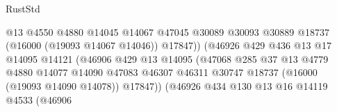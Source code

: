 \begin{lexlean}{RustStd}
\begin{coremodule}
                                                  @13
                                                  @4550
                                                  @4880
                                                  @14045
                                                  @14067
                                                  @47045
                                                  @30089
                                                  @30093
                                                  @30889
                                                  @18737
                                                  (@16000 (@19093 @14067 @14046))
                                                  @17847))
                                              (@46926
                                                @429
                                                @436
                                                @13
                                                @17
                                                @14095
                                                @14121
                                                (@46906
                                                  @429
                                                  @13
                                                  @14095
                                                  (@47068
                                                    @285
                                                    @37
                                                    @13
                                                    @4779
                                                    @4880
                                                    @14077
                                                    @14090
                                                    @47083
                                                    @46307
                                                    @46311
                                                    @30747
                                                    @18737
                                                    (@16000 (@19093 @14090 @14078))
                                                    @17847))
                                                (@46926
                                                  @434
                                                  @130
                                                  @13
                                                  @16
                                                  @14119
                                                  @4533
                                                  (@46906

\end{coremodule}
\end{lexlean}
